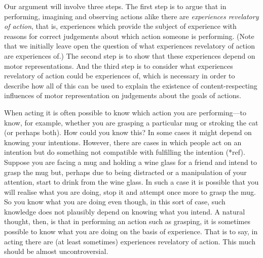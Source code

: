 \documentclass[12pt,\papersize]{extarticle}
\begin{document}
Our argument will involve three steps. The first step is to argue that in performing, imagining and observing actions alike there are \emph{experiences revelatory of action}, that is, experiences which provide the subject of experience with reasons for correct judgements about which action someone is performing.  (Note that we initially leave open the question of what experiences revelatory of action are experiences of.)  The second step is to show that these experiences depend on motor representations.  And the third step is to consider what experiences revelatory of action could be experiences of, which is necessary in order to describe how all of this can be used to explain the existence of content-respecting influences of motor representation on judgements about the goals of actions.

When acting it is often possible to know which action you are performing---to know, for example, whether you are grasping a particular mug or stroking the cat (or perhaps both). How could you know this?  In some cases it might depend on knowing your intentions. However, there are cases in which people act on an intention but do something not compatible with fulfilling the intention (*ref). Suppose you are facing a mug and holding a wine glass for a friend and intend to grasp the mug but, perhaps due to being distracted or a manipulation of your attention, start to drink from the wine glass.  In such a case it is possible that you will realise what you are doing, stop it and attempt once more to grasp the mug. So you know what you are doing even though, in this sort of case, such knowledge does not plausibly depend on knowing what you intend.  A natural thought, then, is that in performing an action such as grasping, it is sometimes possible to know what you are doing on the basis of experience. That is to say, in acting there are (at least sometimes) experiences revelatory of action. This much should be almost uncontroversial.
\end{document}
